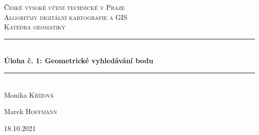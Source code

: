 \documentclass[11pt]{article}
\begin{document}

\begin{titlepage} %
	\newcommand{\HRule}{\rule{\linewidth}{0.5mm}} %
	
	\center %
	
	
	\textsc{\LARGE České vysoké učení technické v Praze}\\[1.5cm] %
	
	\textsc{\Large Algoritmy digitální kartografie a GIS}\\[0.5cm] %
	
	\textsc{\large Katedra geomatiky}\\[0.5cm] %
	
	
	\HRule\\[0.4cm]
	
	{\huge\bfseries Úloha č. 1: Geometrické vyhledávání bodu}\\[0.4cm] %
	
	\HRule\\[1.5cm]
	
	
	

	
	Monika \textsc{Křížová} %
	
	Marek \textsc{Hoffmann}
	
	
	\vfill\vfill\vfill %
	
	{\large 18.10.2021} %
	
	
	 
	
	\vfill %
	
\end{titlepage}
\end{document}
